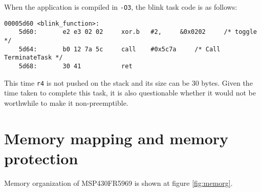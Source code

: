 \documentclass[11pt, oneside]{article}   	%
\begin{document}
When the application is compiled in \lstinline{-O3}, the blink task code is as follows:

\begin{lstlisting}[basicstyle=\footnotesize\ttfamily]
00005d60 <blink_function>:
    5d60:       e2 e3 02 02     xor.b   #2,     &0x0202     /* toggle     */
    5d64:       b0 12 7a 5c     call    #0x5c7a     /* Call TerminateTask */ 
    5d68:       30 41           ret                     
\end{lstlisting}

This time \lstinline{r4} is not pushed on the stack and its size can be 30 bytes. Given the time taken to complete this task, it is also questionable whether it would not be worthwhile to make it non-preemptible.

\section{Memory mapping and memory protection}

Memory organization of MSP430FR5969 is shown at figure \ref{fig:memorg}. 
\end{document}
